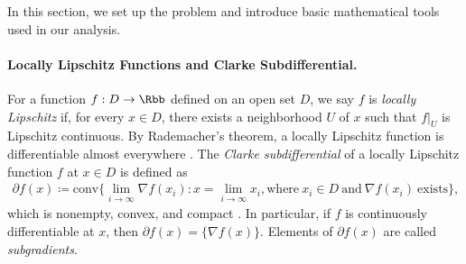 In this section, we set up the problem and introduce basic mathematical tools used in our analysis.


\paragraph{Locally Lipschitz Functions and Clarke Subdifferential.} 
For a function $f: D \to \Rbb$ defined on an open set $D$, we say $f$ is \emph{locally Lipschitz} if, for every $x\in D$, there exists a neighborhood $U$ of $x$ such that $f|_U$ is Lipschitz continuous.  
By Rademacher's theorem, a locally Lipschitz function is differentiable almost everywhere \citep{borwein2000convex}. 
The {\it Clarke subdifferential} of a locally Lipschitz function $f$ at $x\in D$ is defined as 
\[
\begin{aligned}
\partial f(x) \coloneqq \text{conv} \bigg\{ 
 \lim_{i\to \infty} \nabla f(x_i) : x= \lim_{i\to \infty} x_i, 
\text{where}\ x_i \in D \ \text{and}\ \nabla f(x_i) \ \text{exists}
  \bigg\},
\end{aligned}
\]
which is nonempty, convex, and compact \citep{clarke1975generalized}. 
In particular, if $f$ is continuously differentiable at $x$, then $\partial f(x) = \{\nabla f(x)\}$. 
Elements of $\partial f(x)$ are called {\it subgradients}. 




